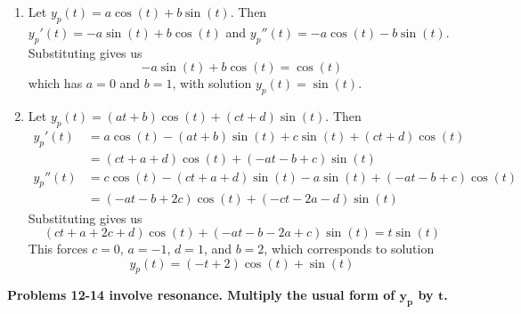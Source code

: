 \documentclass[a4paper]{article}
\begin{document}
\begin{enumerate}[label=(\alph*)]
	\item Let \( y_{p } \!\left( t  \right) = a \cos\!\left(t \right) + b \sin\!\left(t \right)  \). Then \( y_{p }'\!\left( t  \right) = -a \sin\!\left(t \right) + b \cos\!\left(t \right)  \) and \( y_{p }''\!\left( t  \right) = -a \cos\!\left(t \right) - b \sin\!\left(t \right)  \). Substituting gives us
	\[
		-a \sin\!\left(t \right) + b \cos\!\left(t \right) = \cos\!\left(t \right)  
	\]
	which has \( a = 0 \) and \( b = 1 \), with solution \( y_{p } \!\left( t  \right) = \sin\!\left(t \right)  \).
	\item Let \( y_{p } \!\left( t  \right) = \!\left( at + b  \right)\cos\!\left(t \right) + \!\left( ct + d  \right)\sin\!\left(t \right)  \). Then
	\begin{align*}
		y_{p }'\!\left( t  \right) & = a \cos\!\left(t \right) - \!\left( at + b  \right)\sin\!\left(t \right) + c \sin\!\left(t \right) + \!\left( ct + d  \right)\cos\!\left(t \right)  \\
					   & = \!\left( ct + a + d  \right)\cos\!\left(t \right) + \!\left( -at - b + c  \right)\sin\!\left(t \right) \\
		y_{p }''\!\left( t  \right) & = c \cos\!\left(t \right) - \!\left( ct + a + d  \right) \sin\!\left(t \right) - a \sin\!\left(t \right) + \!\left( -at - b + c  \right) \cos\!\left(t \right)  \\ 
					    & = \!\left( -at - b + 2c \right) \cos\!\left(t \right) + \!\left( -ct - 2a - d  \right) \sin\!\left(t \right) 
	\end{align*}
	Substituting gives us
	\[
		\!\left( ct + a + 2c + d  \right) \cos\!\left(t \right) + \!\left( -at - b - 2a + c  \right) \sin\!\left(t \right) = t \sin\!\left(t \right)  
	\]
	This forces \( c = 0 \), \( a = -1 \), \( d = 1 \), and \( b = 2 \), which corresponds to solution
	\[
		y_{p } \!\left( t  \right) = \!\left( -t + 2 \right)\cos\!\left(t \right) + \sin\!\left(t \right)  
	\]
\end{enumerate}

\textbf{Problems 12-14 involve resonance. Multiply the usual form of \( \pmb{y_{p}} \) by \( \pmb{t} \).}

\vspace{12pt}

\end{document}
